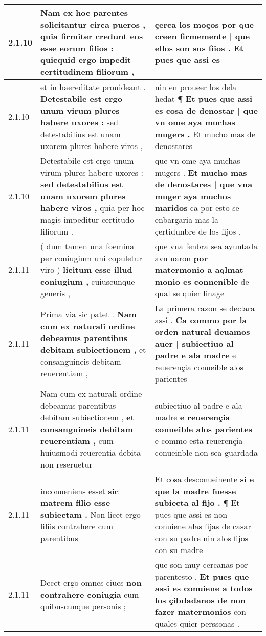 \begin{tabular}{|p{1cm}|p{6.5cm}|p{6.5cm}|}
2.1.10 & Nam ex hoc parentes solicitantur circa pueros , \textbf{ quia firmiter credunt eos esse eorum filios : } quicquid ergo impedit certitudinem filiorum , & çerca los moços \textbf{ por que creen firmemente | que ellos son sus fiios . } Et pues que assi es \\\hline
2.1.10 & et in haereditate prouideant . \textbf{ Detestabile est ergo unum virum plures habere uxores : } sed detestabilius est unam uxorem plures habere viros , & nin en proueer los dela hedat ¶ \textbf{ Et pues que assi es cosa de denostar | que vn ome aya muchas mugers . } Et mucho mas de denostares \\\hline
2.1.10 & Detestabile est ergo unum virum plures habere uxores : \textbf{ sed detestabilius est unam uxorem plures habere viros , } quia per hoc magis impeditur certitudo filiorum . & que vn ome aya muchas mugers . \textbf{ Et mucho mas de denostares | que vna muger aya muchos maridos } ca por esto se enbargaria mas la çertidunbre de los fijos . \\\hline
2.1.11 & ( dum tamen una foemina per coniugium uni copuletur viro ) \textbf{ licitum esse illud coniugium , } cuiuscunque generis , & que vna fenbra sea ayuntada avn uaron \textbf{ por matermonio a aqlmat monio es connenible } de qual se quier linage \\\hline
2.1.11 & Prima via sic patet . \textbf{ Nam cum ex naturali ordine debeamus parentibus debitam subiectionem , } et consanguineis debitam reuerentiam , & La primera razon se declara assi . \textbf{ Ca commo por la orden natural deuamos auer | subiectiuo al padre e ala madre } e reuerençia conueible alos parientes \\\hline
2.1.11 & Nam cum ex naturali ordine debeamus parentibus debitam subiectionem , \textbf{ et consanguineis debitam reuerentiam , } cum huiusmodi reuerentia debita non reseruetur & subiectiuo al padre e ala madre \textbf{ e reuerençia conueible alos parientes } e commo esta reuerençia conueinble non sea guardada \\\hline
2.1.11 & inconueniens esset \textbf{ sic matrem filio esse subiectam . } Non licet ergo filiis contrahere cum parentibus & Et cosa desconueinente \textbf{ si e que la madre fuesse subiecta al fijo . } ¶ Et pues que assi es non conuiene alas fijas de casar con su padre nin alos fijos con su madre \\\hline
2.1.11 & Decet ergo omnes ciues \textbf{ non contrahere coniugia } cum quibuscunque personis ; & que son muy cercanas por parentesto . \textbf{ Et pues que assi es conuiene a todos los çibdadanos de non fazer matermonios } con quales quier perssonas . \\\hline

\end{tabular}
